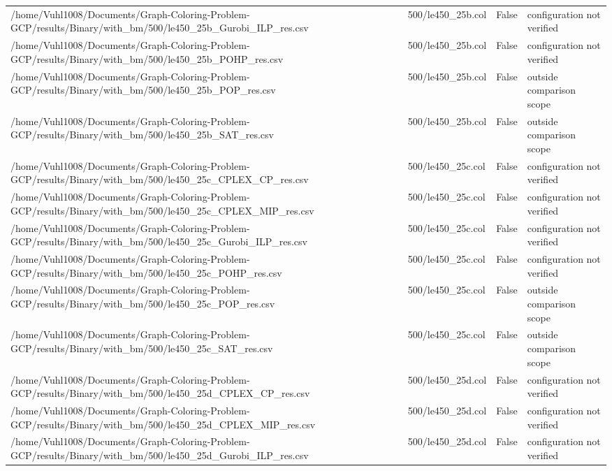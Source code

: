 \begin{table}[htbp]
\begin{tabular}{llll}
/home/Vuhl1008/Documents/Graph-Coloring-Problem-GCP/results/Binary/with\_bm/500/le450\_25b\_Gurobi\_ILP\_res.csv & 500/le450\_25b.col & False & configuration not verified \\
/home/Vuhl1008/Documents/Graph-Coloring-Problem-GCP/results/Binary/with\_bm/500/le450\_25b\_POHP\_res.csv & 500/le450\_25b.col & False & configuration not verified \\
/home/Vuhl1008/Documents/Graph-Coloring-Problem-GCP/results/Binary/with\_bm/500/le450\_25b\_POP\_res.csv & 500/le450\_25b.col & False & outside comparison scope \\
/home/Vuhl1008/Documents/Graph-Coloring-Problem-GCP/results/Binary/with\_bm/500/le450\_25b\_SAT\_res.csv & 500/le450\_25b.col & False & outside comparison scope \\
/home/Vuhl1008/Documents/Graph-Coloring-Problem-GCP/results/Binary/with\_bm/500/le450\_25c\_CPLEX\_CP\_res.csv & 500/le450\_25c.col & False & configuration not verified \\
/home/Vuhl1008/Documents/Graph-Coloring-Problem-GCP/results/Binary/with\_bm/500/le450\_25c\_CPLEX\_MIP\_res.csv & 500/le450\_25c.col & False & configuration not verified \\
/home/Vuhl1008/Documents/Graph-Coloring-Problem-GCP/results/Binary/with\_bm/500/le450\_25c\_Gurobi\_ILP\_res.csv & 500/le450\_25c.col & False & configuration not verified \\
/home/Vuhl1008/Documents/Graph-Coloring-Problem-GCP/results/Binary/with\_bm/500/le450\_25c\_POHP\_res.csv & 500/le450\_25c.col & False & configuration not verified \\
/home/Vuhl1008/Documents/Graph-Coloring-Problem-GCP/results/Binary/with\_bm/500/le450\_25c\_POP\_res.csv & 500/le450\_25c.col & False & outside comparison scope \\
/home/Vuhl1008/Documents/Graph-Coloring-Problem-GCP/results/Binary/with\_bm/500/le450\_25c\_SAT\_res.csv & 500/le450\_25c.col & False & outside comparison scope \\
/home/Vuhl1008/Documents/Graph-Coloring-Problem-GCP/results/Binary/with\_bm/500/le450\_25d\_CPLEX\_CP\_res.csv & 500/le450\_25d.col & False & configuration not verified \\
/home/Vuhl1008/Documents/Graph-Coloring-Problem-GCP/results/Binary/with\_bm/500/le450\_25d\_CPLEX\_MIP\_res.csv & 500/le450\_25d.col & False & configuration not verified \\
/home/Vuhl1008/Documents/Graph-Coloring-Problem-GCP/results/Binary/with\_bm/500/le450\_25d\_Gurobi\_ILP\_res.csv & 500/le450\_25d.col & False & configuration not verified \\

\end{tabular}
\end{table}
